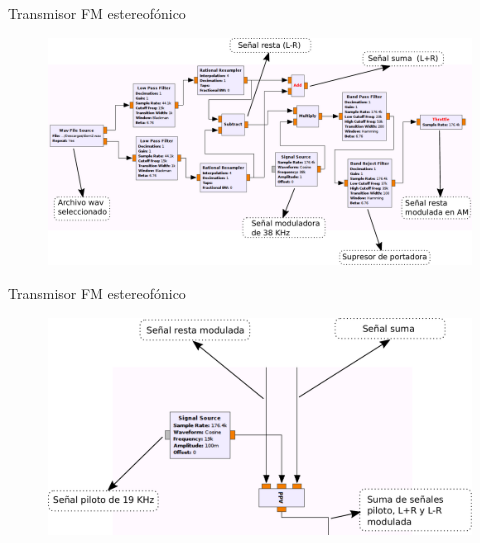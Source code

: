 \begin{frame}{Transmisor FM estereofónico}

\begin{figure}[H]
\centering
\vspace{-3mm}
\includegraphics[width=\textwidth]{parte3/lab12/pdf/lab12_2.pdf}
\end{figure}
    
\end{frame}

\begin{frame}{Transmisor FM estereofónico}

\begin{figure}[H]
\centering
\vspace{-3mm}
\includegraphics[width=\textwidth]{parte3/lab12/pdf/lab12_3.pdf}
\end{figure}
    
\end{frame}

